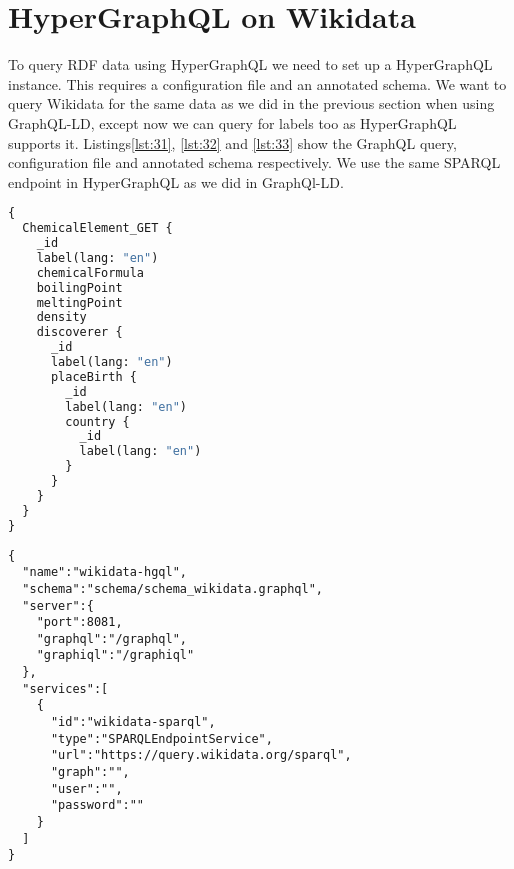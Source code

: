 \section{HyperGraphQL on Wikidata}

To query RDF data using HyperGraphQL we need to set up a HyperGraphQL instance. This requires a configuration file and an annotated schema. We want to query Wikidata for the same data as we did in the previous section when using GraphQL-LD, except now we can query for labels too as HyperGraphQL supports it. Listings\ref{lst:31}, \ref{lst:32} and \ref{lst:33} show the GraphQL query, configuration file and annotated schema respectively. We use the same SPARQL endpoint in HyperGraphQL as we did in GraphQl-LD.

\begin{minipage}{\linewidth}
\begin{lstlisting}[label=lst:31, caption={A GraphQL Query in HyperGraphQL}, language=GraphQL]
{
  ChemicalElement_GET {
    _id
    label(lang: "en")
    chemicalFormula
    boilingPoint
    meltingPoint
    density
    discoverer {
      _id
      label(lang: "en")
      placeBirth {
        _id
        label(lang: "en")
        country {
          _id
          label(lang: "en")
        }
      }
    }
  }
}
\end{lstlisting}
\end{minipage}

\begin{minipage}{\linewidth}
\begin{lstlisting}[label=lst:31, caption={Configuration file}, language=GraphQLException3]
{
  "name":"wikidata-hgql",
  "schema":"schema/schema_wikidata.graphql",
  "server":{
    "port":8081,
    "graphql":"/graphql",
    "graphiql":"/graphiql"
  },
  "services":[
    {
      "id":"wikidata-sparql",
      "type":"SPARQLEndpointService",
      "url":"https://query.wikidata.org/sparql",
      "graph":"",
      "user":"",
      "password":""
    }
  ]
}
\end{lstlisting}
\end{minipage}

